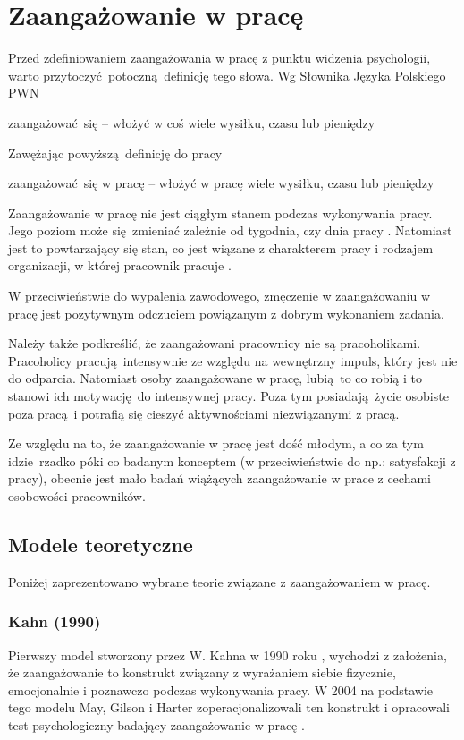 \chapter{Zaangażowanie w pracę}
Przed zdefiniowaniem zaangażowania w pracę z punktu widzenia psychologii, warto przytoczyć potoczną definicję tego słowa. Wg Słownika Języka Polskiego PWN
\begin{iquote}
zaangażować się -- włożyć w coś wiele wysiłku, czasu lub pieniędzy \cite{web:pwn-eng}
\end{iquote}
Zawężając powyższą definicję do pracy
\begin{iquote}
zaangażować się w pracę -- włożyć w pracę wiele wysiłku, czasu lub pieniędzy
\end{iquote}

Zaangażowanie w pracę nie jest ciągłym stanem podczas wykonywania pracy. Jego poziom może się zmieniać zależnie od tygodnia, czy dnia pracy \cite{bakker2010weekly}. Natomiast jest to powtarzający się stan, co jest wiązane z charakterem pracy i rodzajem organizacji, w której pracownik pracuje \cite{macey2008meaning}.

W przeciwieństwie do wypalenia zawodowego, zmęczenie w zaangażowaniu w pracę jest pozytywnym odczuciem powiązanym z dobrym wykonaniem zadania.

Należy także podkreślić, że zaangażowani pracownicy nie są pracoholikami. Pracoholicy pracują intensywnie ze względu na wewnętrzny impuls, który jest nie do odparcia. Natomiast osoby zaangażowane w pracę, lubią to co robią i to stanowi ich motywację do intensywnej pracy. Poza tym posiadają życie osobiste poza pracą i potrafią się cieszyć aktywnościami niezwiązanymi z pracą.

Ze względu na to, że zaangażowanie w pracę jest dość młodym, a co za tym idzie rzadko póki co badanym konceptem (w przeciwieństwie do np.: satysfakcji z pracy), obecnie jest mało badań wiążących zaangażowanie w prace z cechami osobowości pracowników.
\section{Modele teoretyczne}
Poniżej zaprezentowano wybrane teorie związane z zaangażowaniem w pracę.

\subsection{Kahn (1990)}
\label{sec:theory-eng-kahn}
Pierwszy model stworzony przez W. Kahna w 1990  roku \cite{kahn1990psychological}, wychodzi z założenia, że zaangażowanie to konstrukt związany z wyrażaniem siebie fizycznie, emocjonalnie i poznawczo podczas wykonywania pracy. W 2004 na podstawie tego modelu May, Gilson i Harter zoperacjonalizowali ten konstrukt i opracowali test psychologiczny badający zaangażowanie w pracę \cite{may2004psychological}.

